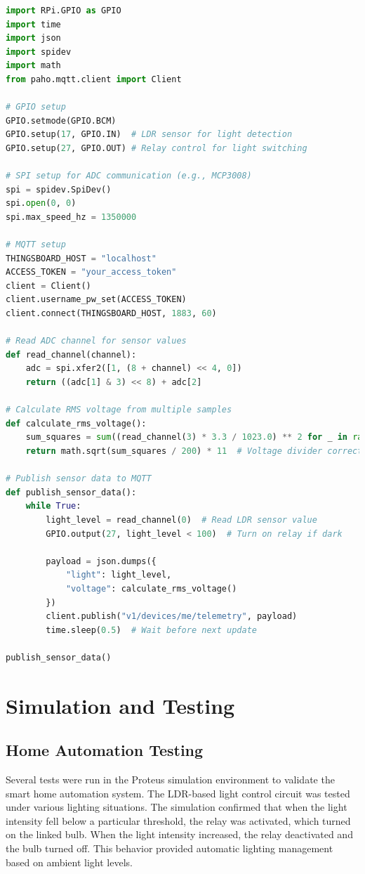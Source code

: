 \documentclass[a4paper,12pt]{report}
\begin{document}
\begin{lstlisting}[language=Python]
import RPi.GPIO as GPIO
import time
import json
import spidev
import math
from paho.mqtt.client import Client

# GPIO setup
GPIO.setmode(GPIO.BCM)
GPIO.setup(17, GPIO.IN)  # LDR sensor for light detection
GPIO.setup(27, GPIO.OUT) # Relay control for light switching

# SPI setup for ADC communication (e.g., MCP3008)
spi = spidev.SpiDev()
spi.open(0, 0)
spi.max_speed_hz = 1350000

# MQTT setup
THINGSBOARD_HOST = "localhost"
ACCESS_TOKEN = "your_access_token"
client = Client()
client.username_pw_set(ACCESS_TOKEN)
client.connect(THINGSBOARD_HOST, 1883, 60)

# Read ADC channel for sensor values
def read_channel(channel):
    adc = spi.xfer2([1, (8 + channel) << 4, 0])
    return ((adc[1] & 3) << 8) + adc[2]

# Calculate RMS voltage from multiple samples
def calculate_rms_voltage():
    sum_squares = sum((read_channel(3) * 3.3 / 1023.0) ** 2 for _ in range(200))
    return math.sqrt(sum_squares / 200) * 11  # Voltage divider correction

# Publish sensor data to MQTT
def publish_sensor_data():
    while True:
        light_level = read_channel(0)  # Read LDR sensor value
        GPIO.output(27, light_level < 100)  # Turn on relay if dark
        
        payload = json.dumps({
            "light": light_level,
            "voltage": calculate_rms_voltage()
        })
        client.publish("v1/devices/me/telemetry", payload)
        time.sleep(0.5)  # Wait before next update

publish_sensor_data()
\end{lstlisting}

\section{Simulation and Testing}

\subsection{Home Automation Testing}
Several tests were run in the Proteus simulation environment to validate the smart home automation system.  The LDR-based light control circuit was tested under various lighting situations.  The simulation confirmed that when the light intensity fell below a particular threshold, the relay was activated, which turned on the linked bulb.  When the light intensity increased, the relay deactivated and the bulb turned off.  This behavior provided automatic lighting management based on ambient light levels.
\end{document}
